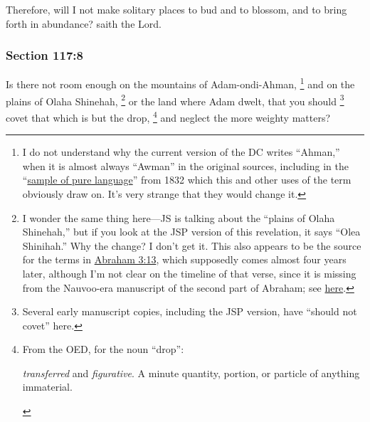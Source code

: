 		Therefore, will I not make solitary places to bud and to blossom, and to bring forth in abundance?  saith the Lord.


	\subsubsection{Section 117:8} %
		\label{DC117-8}

		Is there not room enough on the mountains of Adam-ondi-Ahman,%
			\footnote{%
				I do not understand why the current version of the DC writes ``Ahman,'' when it is almost always ``Awman'' in the original sources, including in the ``\hyperref[EMS-1832-JS-CIR-4-MAR-1832-LANG]{sample of pure language}'' from 1832 which this and other uses of the term obviously draw on. It's very strange that they would change it.
				}
		and on the plains of Olaha Shinehah,%
			\footnote{%
				I wonder the same thing here---JS is talking about the ``plains of Olaha Shinehah,'' but if you look at the JSP version of this revelation, it says ``Olea Shinihah.'' Why the change? I don't get it. This also appears to be the source for the terms in \hyperref[ABRAHAM-3-13]{Abraham 3:13}, which supposedly comes almost four years later, although I'm not clear on the timeline of that verse, since it is missing from the Nauvoo-era manuscript of the second part of Abraham; see \href{https://www.josephsmithpapers.org/paper-summary/book-of-abraham-manuscript-8-circa-15-march-1842-abraham-318-26/1}{here}.
				} 
		or the land where Adam dwelt, that you should%
			\footnote{%
				Several early manuscript copies, including the JSP version, have ``should not covet'' here.
				}
		covet that which is but the drop,%
			\footnote{%
				From the OED, for the noun ``drop'':
					\begin{compactitem}
						\item[I.7] \textit{transferred} and \textit{figurative}. A minute quantity, portion, or particle of anything immaterial.
					\end{compactitem}
				}
		and neglect the more weighty matters?

